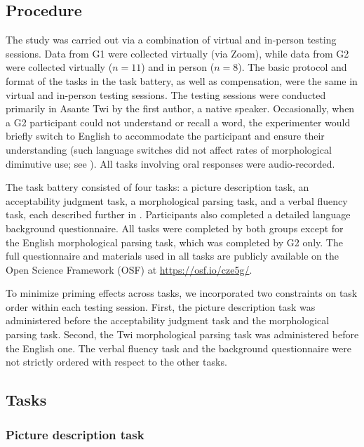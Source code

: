 \documentclass[output=paper,colorlinks,citecolor=brown]{langscibook}
\begin{document}
\subsection{Procedure}
\label{ProcedureSec}

The study was carried out via a combination of virtual and in-person testing sessions. Data from G1 were collected virtually (via Zoom), while data from G2 were collected virtually ($n=11$) and in person ($n=8$). The basic protocol and format of the tasks in the task battery, as well as compensation, were the same in virtual and in-person testing sessions. The testing sessions were conducted primarily in Asante Twi by the first author, a native speaker. Occasionally, when a G2 participant could not understand or recall a word, the experimenter would briefly switch to English to accommodate the participant and ensure their understanding (such language switches did not affect rates of morphological diminutive use; see ). All tasks involving oral responses were audio-recorded. 

The task battery consisted of four tasks: a picture description task, an acceptability judgment task, a morphological parsing task, and a verbal fluency task, each described further in . Participants also completed a detailed language background questionnaire. All tasks were completed by both groups except for the English morphological parsing task, which was completed by G2 only. The full questionnaire and materials used in all tasks are publicly available on the Open Science Framework (OSF) at \url{https://osf.io/cze5g/}.

To minimize priming effects across tasks, we incorporated two constraints on task order within each testing session. First, the picture description task was administered before the acceptability judgment task and the morphological parsing task. Second, the Twi morphological parsing task was administered before the English one. The verbal fluency task and the background questionnaire were not strictly ordered with respect to the other tasks.  

\subsection{Tasks}
\label{TasksSec}

\subsubsection{Picture description task}
\label{PDTSec}
\end{document}
